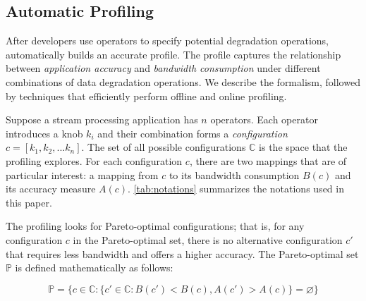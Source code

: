\subsection{Automatic Profiling}
\label{sec:automatic-profiling}

After developers use \maybe{} operators to specify potential degradation
operations, \sysname{} automatically builds an accurate profile. The profile
captures the relationship between \textit{application accuracy} and
\textit{bandwidth consumption} under different combinations of data degradation
operations. We describe the formalism, followed by techniques that efficiently
perform offline and online profiling.

 Suppose a stream processing application has $n$
\maybe{} operators. Each operator introduces a knob $k_i$ and their combination
forms a \textit{configuration} $c = [k_{1}, k_{2}, ... k_{n}]$. The set of all
possible configurations $\mathbb{C}$ is the space that the profiling
explores. For each configuration $c$, there are two mappings that are of
particular interest: a mapping from $c$ to its bandwidth consumption $B(c)$ and
its accuracy measure $A(c)$. \autoref{tab:notations} summarizes the notations
used in this paper.

The profiling looks for Pareto-optimal configurations; that is, for any
configuration $c$ in the Pareto-optimal set, there is no alternative
configuration $c'$ that requires less bandwidth and offers a higher
accuracy. The Pareto-optimal set $\mathbb{P}$ is defined mathematically as
follows:

{\small \vspace{-1em}
  \begin{equation}
  \mathbb{P} = \{ c \in \mathbb{C} : \{ c' \in \mathbb{C}: B(c') < B(c),
  A(c') > A(c) \} = \varnothing\}
  \label{eq:pareto}
\end{equation}
}%

